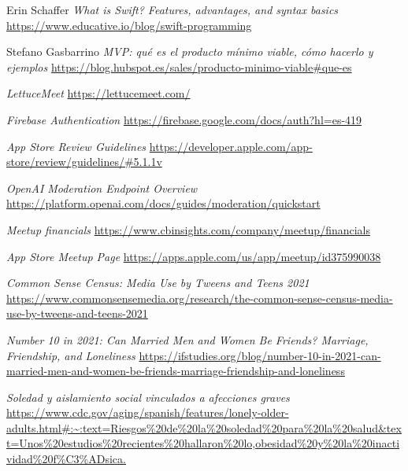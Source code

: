 
\begin{thebibliography}{9}
    Erin Schaffer
    \textit{What is Swift? Features, advantages, and syntax basics}
    \url{https://www.educative.io/blog/swift-programming}

    Stefano Gasbarrino
    \textit{MVP: qué es el producto mínimo viable, cómo hacerlo y ejemplos}
    \url{https://blog.hubspot.es/sales/producto-minimo-viable#que-es}

    \textit{LettuceMeet}
    \url{https://lettucemeet.com/}

    \textit{Firebase Authentication}
    \url{https://firebase.google.com/docs/auth?hl=es-419}

    \textit{App Store Review Guidelines}
    \url{https://developer.apple.com/app-store/review/guidelines/#5.1.1v}

    \textit{OpenAI Moderation Endpoint Overview}
    \url{https://platform.openai.com/docs/guides/moderation/quickstart}

    \textit{Meetup financials}
    \url{https://www.cbinsights.com/company/meetup/financials}

    \textit{App Store Meetup Page}
    \url{https://apps.apple.com/us/app/meetup/id375990038}

    \textit{Common Sense Census: Media Use by Tweens and Teens 2021}
    \url{https://www.commonsensemedia.org/research/the-common-sense-census-media-use-by-tweens-and-teens-2021}

    \textit{Number 10 in 2021: Can Married Men and Women Be Friends? Marriage, Friendship, and Loneliness}
    \url{https://ifstudies.org/blog/number-10-in-2021-can-married-men-and-women-be-friends-marriage-friendship-and-loneliness}

    \textit{Soledad y aislamiento social vinculados a afecciones graves}
    \url{https://www.cdc.gov/aging/spanish/features/lonely-older-adults.html#:~:text=Riesgos%20de%20la%20soledad%20para%20la%20salud&text=Unos%20estudios%20recientes%20hallaron%20lo,obesidad%20y%20la%20inactividad%20f%C3%ADsica.}

\end{thebibliography}